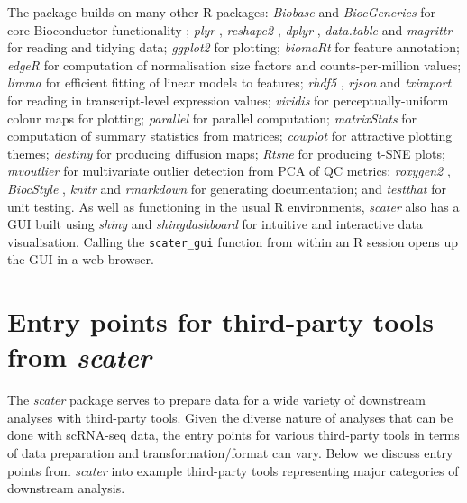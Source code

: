 \documentclass{revtex4}
\begin{document}
The package builds on many other R packages: \emph{Biobase} and \emph{BiocGenerics} for core Bioconductor functionality  \citep{Huber2015-en}; \emph{plyr} \citep{Wickham2015-kj}, \emph{reshape2} \citep{Wickham2012-ec}, \emph{dplyr} \citep{Wickham2015-la}, \emph{data.table} \citep{Dowle2015-zc} and \emph{magrittr} \citep{Bache2014-sa} for reading and
tidying data; \emph{ggplot2} \citep{Wickham2016-dc} for plotting; \emph{biomaRt} \citep{Durinck2005-yz} for feature annotation; \emph{edgeR} \citep{Robinson2010-ky} for computation of normalisation size factors and counts-per-million values; \emph{limma} \citep{Ritchie2015-so} for efficient fitting of linear models to features; \emph{rhdf5} \citep{Fischer2016-me}, \emph{rjson} \citep{Couture-Beil2014-kk} and \emph{tximport} \citep{Soneson2015-fw} for reading in transcript-level expression values;
\emph{viridis} \citep{Garnier2016-hk} for perceptually-uniform colour
maps for plotting; \emph{parallel} for parallel computation; \emph{matrixStats} \citep{Bengtsson2016-tn} for computation of summary statistics from matrices; \emph{cowplot} \citep{Wilke2016-hj} for attractive plotting themes; \emph{destiny} \citep{Angerer2015-sw} for producing diffusion maps; \emph{Rtsne} \citep{Krijthe2015-is} for producing t-SNE plots; \emph{mvoutlier}
\citep{Filzmoser2015-kx} for multivariate outlier detection from PCA of QC metrics; \emph{roxygen2} \citep{Wickham2015-pu}, \emph{BiocStyle} \citep{Huber2015-en}, \emph{knitr} \citep{Xie2013-bn} and \emph{rmarkdown} \citep{Allaire2016-dl} for generating documentation; and \emph{testthat} \citep{Wickham2011-cj} for unit testing. As well as functioning in the usual R environments, \emph{scater} also has a GUI built using
\emph{shiny} \citep{Chang2016-of} and \emph{shinydashboard} \citep{Chang2015-bn} for intuitive and interactive data visualisation. Calling the \verb|scater_gui| function from within an R session opens up the GUI in a web browser.


\section*{Entry points for third-party tools from \emph{scater}}

The \emph{scater} package serves to prepare data for a wide variety of downstream analyses with third-party tools. Given the diverse nature of analyses that can be done with scRNA-seq data, the entry points for various third-party tools in terms of data preparation and transformation/format can vary. Below we discuss entry points from \emph{scater} into example third-party tools representing major categories of downstream analysis.
\end{document}
